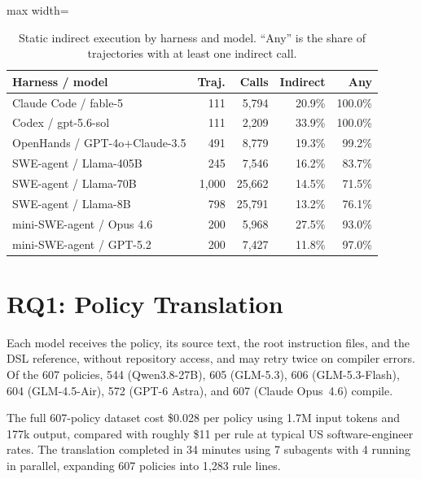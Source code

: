 \begin{table}[t]\small
\centering
\caption{Static indirect execution by harness and model. ``Any'' is the share of trajectories with at least one indirect call.}
\label{tab:supp:static}
\begin{adjustbox}{max width=\columnwidth}
\begin{tabular}{lrrrr}
\toprule
Harness / model & Traj. & Calls & Indirect & Any \\
\midrule
Claude Code / fable-5 & 111 & 5{,}794 & 20.9\% & 100.0\% \\
Codex / gpt-5.6-sol & 111 & 2{,}209 & 33.9\% & 100.0\% \\
OpenHands / GPT-4o+Claude-3.5 & 491 & 8{,}779 & 19.3\% & 99.2\% \\
SWE-agent / Llama-405B & 245 & 7{,}546 & 16.2\% & 83.7\% \\
SWE-agent / Llama-70B & 1{,}000 & 25{,}662 & 14.5\% & 71.5\% \\
SWE-agent / Llama-8B & 798 & 25{,}791 & 13.2\% & 76.1\% \\
mini-SWE-agent / Opus 4.6 & 200 & 5{,}968 & 27.5\% & 93.0\% \\
mini-SWE-agent / GPT-5.2 & 200 & 7{,}427 & 11.8\% & 97.0\% \\
\bottomrule
\end{tabular}
\end{adjustbox}
\end{table}

\section{RQ1: Policy Translation}
\label{sec:supp:translation}
Each model receives the policy, its source text, the root instruction files, and the DSL reference, without repository access, and may retry twice on compiler errors.
Of the 607 policies, 544 (Qwen3.8-27B), 605 (GLM-5.3), 606 (GLM-5.3-Flash), 604 (GLM-4.5-Air), 572 (GPT-6 Astra), and 607 (Claude Opus~4.6) compile.

The full 607-policy dataset cost \$0.028 per policy using 1.7M input tokens and 177k output, compared with roughly \$11 per rule at typical US software-engineer rates.
The translation completed in 34 minutes using 7 subagents with 4 running in parallel, expanding 607 policies into 1{,}283 rule lines.

